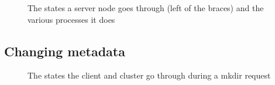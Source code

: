 \begin{figure}[htbp]
	\centering
	
	\caption{The states a server node goes through (left of the braces) and the various processes it does}
	\label{fig:nodelife}
\end{figure}

\subsection{Changing metadata}

\begin{figure}[htbp]
	\centering
	
	\caption{The states the client and cluster go through during a mkdir request}
	\label{fig:mkdir}
\end{figure}
